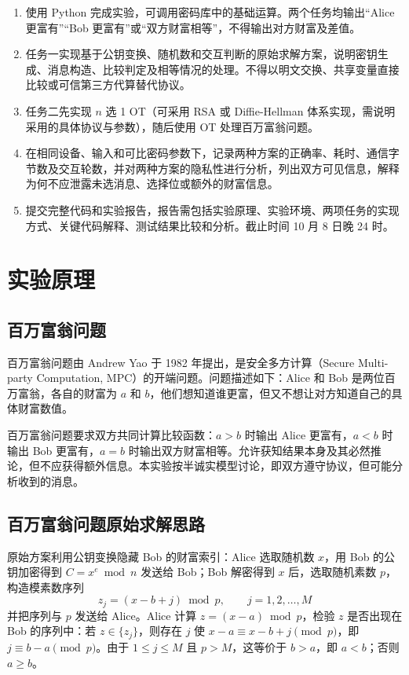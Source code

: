 \documentclass{SYSUReport}
\begin{document}
\begin{enumerate}
    \item 使用 Python 完成实验，可调用密码库中的基础运算。两个任务均输出“Alice 更富有”“Bob 更富有”或“双方财富相等”，不得输出对方财富及差值。
    \item 任务一实现基于公钥变换、随机数和交互判断的原始求解方案，说明密钥生成、消息构造、比较判定及相等情况的处理。不得以明文交换、共享变量直接比较或可信第三方代算替代协议。
    \item 任务二先实现 $n$ 选 1 OT（可采用 RSA 或 Diffie-Hellman 体系实现，需说明采用的具体协议与参数），随后使用 OT 处理百万富翁问题。
    \item 在相同设备、输入和可比密码参数下，记录两种方案的正确率、耗时、通信字节数及交互轮数，并对两种方案的隐私性进行分析，列出双方可见信息，解释为何不应泄露未选消息、选择位或额外的财富信息。
    \item 提交完整代码和实验报告，报告需包括实验原理、实验环境、两项任务的实现方式、关键代码解释、测试结果比较和分析。截止时间 10 月 8 日晚 24 时。
\end{enumerate}

\section{实验原理}

\subsection{百万富翁问题}

百万富翁问题由 Andrew Yao 于 1982 年提出，是安全多方计算（Secure Multi-party Computation, MPC）的开端问题。问题描述如下：Alice 和 Bob 是两位百万富翁，各自的财富为 $a$ 和 $b$，他们想知道谁更富，但又不想让对方知道自己的具体财富数值。

百万富翁问题要求双方共同计算比较函数：$a>b$ 时输出 Alice 更富有，$a<b$ 时输出 Bob 更富有，$a=b$ 时输出双方财富相等。允许获知结果本身及其必然推论，但不应获得额外信息。本实验按半诚实模型讨论，即双方遵守协议，但可能分析收到的消息。

\subsection{百万富翁问题原始求解思路}

原始方案利用公钥变换隐藏 Bob 的财富索引：Alice 选取随机数 $x$，用 Bob 的公钥加密得到 $C=x^e \bmod n$ 发送给 Bob；Bob 解密得到 $x$ 后，选取随机素数 $p$，构造模素数序列
\begin{equation}
    z_j = (x - b + j) \bmod p, \qquad j = 1, 2, \ldots, M
\end{equation}
并把序列与 $p$ 发送给 Alice。Alice 计算 $z = (x - a) \bmod p$，检验 $z$ 是否出现在 Bob 的序列中：若 $z \in \{z_j\}$，则存在 $j$ 使 $x-a \equiv x-b+j \pmod p$，即 $j \equiv b-a \pmod p$。由于 $1 \le j \le M$ 且 $p > M$，这等价于 $b > a$，即 $a < b$；否则 $a \ge b$。
\end{document}
